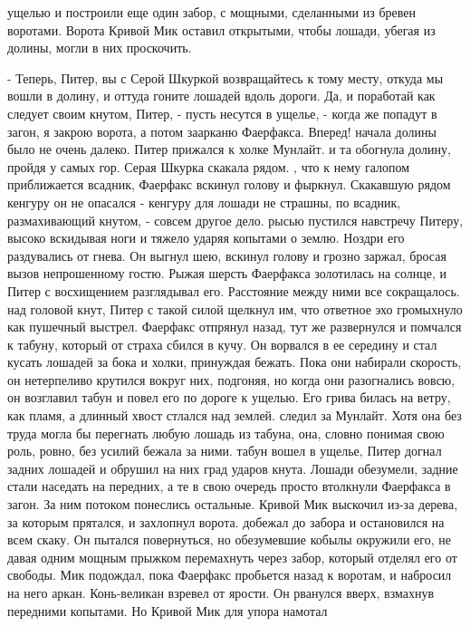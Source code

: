 ущелью и построили еще один забор, с мощными, сделанными из бревен 
воротами. Ворота Кривой Мик оставил открытыми, чтобы лошади, убегая из 
долины, могли в них проскочить.
\par- Теперь, Питер, вы с Серой Шкуркой возвращайтесь к тому месту, 
откуда мы вошли в долину, и оттуда гоните лошадей вдоль дороги. Да, и 
поработай как следует своим кнутом, Питер, - пусть несутся в ущелье, - 
когда же попадут в загон, я закрою ворота, а потом заарканю Фаерфакса. 
Вперед!
 начала долины было не очень далеко. Питер прижался к холке 
Мунлайт. и та обогнула долину, пройдя у самых гор. Серая Шкурка 
скакала рядом.
, что к нему галопом приближается всадник, Фаерфакс вскинул 
голову и фыркнул. Скакавшую рядом кенгуру он не опасался - кенгуру для 
лошади не страшны, по всадник, размахивающий кнутом, - совсем другое 
дело.
 рысью пустился навстречу Питеру, высоко вскидывая ноги и тяжело 
ударяя копытами о землю. Ноздри его раздувались от гнева. Он выгнул 
шею, вскинул голову и грозно заржал, бросая вызов непрошенному гостю. 
Рыжая шерсть Фаерфакса золотилась на солнце, и Питер с восхищением 
разглядывал его. Расстояние между ними все сокращалось.
 над головой кнут, Питер с такой силой щелкнул им, что 
ответное эхо громыхнуло как пушечный выстрел. Фаерфакс отпрянул назад, 
тут же развернулся и помчался к табуну, который от страха сбился в 
кучу. Он ворвался в ее середину и стал кусать лошадей за бока и холки, 
принуждая бежать. Пока они набирали скорость, он нетерпеливо крутился 
вокруг них, подгоняя, но когда они разогнались вовсю, он возглавил 
табун и повел его по дороге к ущелью. Его грива билась на ветру, как 
пламя, а длинный хвост стлался над землей.
 следил за Мунлайт. Хотя она без труда могла бы перегнать 
любую лошадь из табуна, она, словно понимая свою роль, ровно, без 
усилий бежала за ними.
 табун вошел в ущелье, Питер догнал задних лошадей и обрушил 
на них град ударов кнута. Лошади обезумели, задние стали наседать на 
передних, а те в свою очередь просто втолкнули Фаерфакса в загон. За 
ним потоком понеслись остальные. Кривой Мик выскочил из-за дерева, за 
которым прятался, и захлопнул ворота.
 добежал до забора и остановился на всем скаку. Он пытался 
повернуться, но обезумевшие кобылы окружили его, не давая одним мощным 
прыжком перемахнуть через забор, который отделял его от свободы.
 Мик подождал, пока Фаерфакс пробьется назад к воротам, и 
набросил на него аркан. Конь-великан взревел от ярости. Он рванулся 
вверх, взмахнув передними копытами. Но Кривой Мик для упора намотал 
